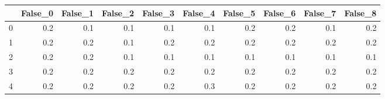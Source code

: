 \begin{tabular}{lrrrrrrrrr}
\toprule
{} &  False\_0 &  False\_1 &  False\_2 &  False\_3 &  False\_4 &  False\_5 &  False\_6 &  False\_7 &  False\_8 \\ \hline
\midrule
0 &      0.2 &      0.1 &      0.1 &      0.1 &      0.1 &      0.2 &      0.2 &      0.1 &      0.2 \\ \hline
1 &      0.2 &      0.2 &      0.1 &      0.2 &      0.2 &      0.2 &      0.2 &      0.2 &      0.2 \\ \hline
2 &      0.2 &      0.2 &      0.1 &      0.1 &      0.1 &      0.1 &      0.1 &      0.1 &      0.1 \\ \hline
3 &      0.2 &      0.2 &      0.2 &      0.2 &      0.2 &      0.2 &      0.2 &      0.2 &      0.2 \\ \hline
4 &      0.2 &      0.2 &      0.2 &      0.2 &      0.3 &      0.2 &      0.2 &      0.2 &      0.2 \\ \hline
\bottomrule
\end{tabular}
